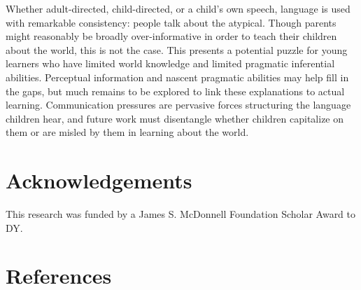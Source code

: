 \documentclass[10pt, letterpaper]{article}
\begin{document}
Whether adult-directed, child-directed, or a child's own speech,
language is used with remarkable consistency: people talk about the
atypical. Though parents might reasonably be broadly over-informative in
order to teach their children about the world, this is not the case.
This presents a potential puzzle for young learners who have limited
world knowledge and limited pragmatic inferential abilities. Perceptual
information and nascent pragmatic abilities may help fill in the gaps,
but much remains to be explored to link these explanations to actual
learning. Communication pressures are pervasive forces structuring the
language children hear, and future work must disentangle whether
children capitalize on them or are misled by them in learning about the
world.

\vspace{1em} 

\hypertarget{acknowledgements}{%
\section{Acknowledgements}\label{acknowledgements}}

This research was funded by a James S. McDonnell Foundation Scholar
Award to DY.

\hypertarget{references}{%
\section{References}\label{references}}

\setlength{\parindent}{-0.1in} 
\setlength{\leftskip}{0.125in}

\noindent
\end{document}
